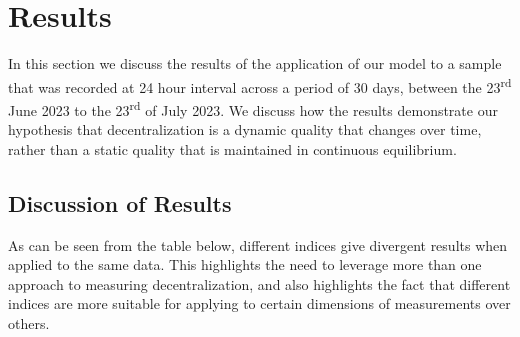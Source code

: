 \documentclass[conference]{IEEEtran}
\begin{document}
\section{Results}

In this section we discuss the results of the application of our model to a sample that was recorded at 24 hour interval across a period of 30 days, between the 23\textsuperscript{rd} June 2023 to the 23\textsuperscript{rd} of July 2023.  We discuss how the results demonstrate our hypothesis that decentralization is a dynamic quality that changes over time, rather than a static quality that is maintained in continuous equilibrium.

\subsection{Discussion of Results}

As can be seen from the table below, different indices give divergent results when applied to the same data.  This highlights the need to leverage more than one approach to measuring decentralization, and also highlights the fact that different indices are more suitable for applying to certain dimensions of measurements over others.
\end{document}
